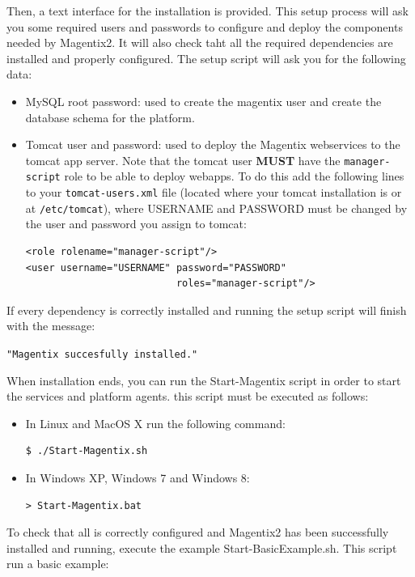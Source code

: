 Then, a text interface for the installation is provided. This setup process will ask you some required users and passwords to configure and deploy the components needed by Magentix2. It will also check taht all the required dependencies are installed and properly configured. The setup script will ask you for the following data:
\begin{itemize}
    \item MySQL root password: used to create the magentix user and create the database schema for the platform.
    \item Tomcat user and password: used to deploy the Magentix webservices to the tomcat app server. Note that the tomcat user \textbf{MUST} have the \texttt{manager-script} role to be able to deploy webapps. To do this add the following lines to your \texttt{tomcat-users.xml} file (located where your tomcat installation is or at \texttt{/etc/tomcat}), where USERNAME and PASSWORD must be changed by the user and password you assign to tomcat:
    \begin{verbatim}
<role rolename="manager-script"/>
<user username="USERNAME" password="PASSWORD" 
                          roles="manager-script"/>
    \end{verbatim}
    
\end{itemize}

If every dependency is correctly installed and running the setup script will finish with the message: 
\begin{center}
\texttt{"Magentix succesfully installed."}
\end{center}

When installation ends, you can run the Start-Magentix script in order to start the services and platform agents. this script must be executed as follows:

\begin{itemize}
    \item In Linux and MacOS X run the following command:
\begin{verbatim}
$ ./Start-Magentix.sh
\end{verbatim}
    \item In Windows XP, Windows 7 and Windows 8:
\begin{verbatim}
> Start-Magentix.bat
\end{verbatim}
\end{itemize}

To check that all is correctly configured and Magentix2 has been successfully installed and running, execute the example Start-BasicExample.sh.
This script run a basic example:

